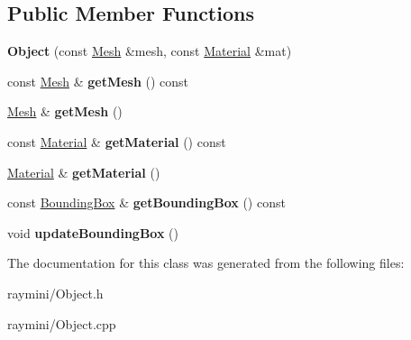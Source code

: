 \subsection*{Public Member Functions}
\begin{DoxyCompactItemize}
\item 
\hypertarget{class_object_a76be6ce9d41e65e06f231ba122c4c6f1}{
{\bfseries Object} (const \hyperlink{class_mesh}{Mesh} \&mesh, const \hyperlink{class_material}{Material} \&mat)}
\label{class_object_a76be6ce9d41e65e06f231ba122c4c6f1}

\item 
\hypertarget{class_object_aca85febe503b1feffdd61cc22777816d}{
const \hyperlink{class_mesh}{Mesh} \& {\bfseries getMesh} () const }
\label{class_object_aca85febe503b1feffdd61cc22777816d}

\item 
\hypertarget{class_object_a2c80996c263bb223ff6a5395d452b2a7}{
\hyperlink{class_mesh}{Mesh} \& {\bfseries getMesh} ()}
\label{class_object_a2c80996c263bb223ff6a5395d452b2a7}

\item 
\hypertarget{class_object_a8b4f09c5a0ab51e58a1d1c2da6f33a18}{
const \hyperlink{class_material}{Material} \& {\bfseries getMaterial} () const }
\label{class_object_a8b4f09c5a0ab51e58a1d1c2da6f33a18}

\item 
\hypertarget{class_object_acda0cee83fc08cc69bdc3f72b8e8b3a7}{
\hyperlink{class_material}{Material} \& {\bfseries getMaterial} ()}
\label{class_object_acda0cee83fc08cc69bdc3f72b8e8b3a7}

\item 
\hypertarget{class_object_a39c1127b2bd6ced2ec79bb80f129301b}{
const \hyperlink{class_bounding_box}{BoundingBox} \& {\bfseries getBoundingBox} () const }
\label{class_object_a39c1127b2bd6ced2ec79bb80f129301b}

\item 
\hypertarget{class_object_a8b5067250bb4000f2e2abc79a5c0f0ef}{
void {\bfseries updateBoundingBox} ()}
\label{class_object_a8b5067250bb4000f2e2abc79a5c0f0ef}

\end{DoxyCompactItemize}


The documentation for this class was generated from the following files:\begin{DoxyCompactItemize}
\item 
raymini/Object.h\item 
raymini/Object.cpp\end{DoxyCompactItemize}

